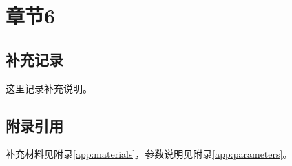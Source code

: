 \chapter{章节6}
\label{chap:chapter6}

\section{补充记录}
这里记录补充说明。

\section{附录引用}
补充材料见附录\ref{app:materials}，参数说明见附录\ref{app:parameters}。
